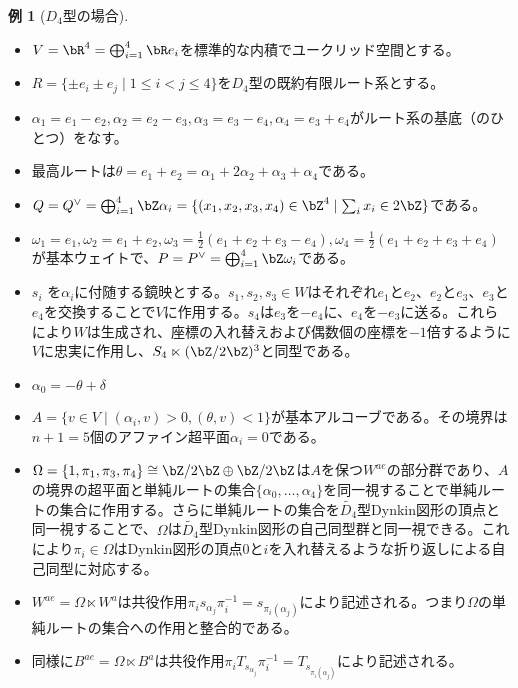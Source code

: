 \documentclass[uplatex, a4paper, dvipdfmx]{jsarticle}
\theoremstyle{definition}
\newtheorem{example}[theorem]{例}
\begin{document}
\begin{example}[$D_4$型の場合]
    \begin{itemize}
        \item  $V = \bR^4 = \bigoplus_{i=1}^4 \bR e_i$を標準的な内積でユークリッド空間とする。
        \item  $R = \{\pm e_i \pm e_j \mid 1 \leq i < j \leq 4\}$を$D_4$型の既約有限ルート系とする。
        \item $\alpha_1 = e_1 - e_2, \alpha_2 = e_2 - e_3, \alpha_3 = e_3 - e_4, \alpha_4 = e_3 + e_4$がルート系の基底（のひとつ）をなす。
        \item 最高ルートは$\theta = e_1 + e_2 = \alpha_1 + 2\alpha_2 + \alpha_3 + \alpha_4$である。
        \item $Q = Q^\vee = \bigoplus_{i=1}^4 \bZ \alpha_i = \{(x_1, x_2, x_3, x_4) \in \bZ^4\mid \sum_i x_i \in 2 \bZ\}$である。
        \item $\omega_1 = e_1, \omega_2 = e_1 + e_2, \omega_3 = \frac{1}{2}(e_1 + e_2 + e_3 - e_4), \omega_4 = \frac{1}{2}(e_1 + e_2 + e_3 + e_4)$が基本ウェイトで、$P = P^\vee = \bigoplus_{i=1}^4 \bZ \omega_i$である。
        \item $s_i$ を$\alpha_i$に付随する鏡映とする。$s_1, s_2, s_3 \in W$はそれぞれ$e_1$と$e_2$、$e_2$と$e_3$、$e_3$と$e_4$を交換することで$V$に作用する。$s_4$は$e_3$を$-e_4$に、$e_4$を$-e_3$に送る。これらにより$W$は生成され、座標の入れ替えおよび偶数個の座標を$-1$倍するように$V$に忠実に作用し、$S_4 \ltimes (\bZ/2\bZ)^3$と同型である。
        \item $\alpha_0 = -\theta + \delta$
        \item $A = \{v \in V \mid (\alpha_i, v)>0, (\theta, v)<1\}$が基本アルコーブである。その境界は$n+1 = 5$個のアファイン超平面$\alpha_i = 0$である。
        \item $\Omega = \{1, \pi_1, \pi_3, \pi_4\} \cong \bZ/2\bZ \oplus \bZ/2\bZ$は$A$を保つ$W^{ae}$の部分群であり、$A$の境界の超平面と単純ルートの集合$\{\alpha_0, \dots, \alpha_4\}$を同一視することで単純ルートの集合に作用する。さらに単純ルートの集合を$\widetilde{D_4}$型Dynkin図形の頂点と同一視することで、$\Omega$は$\widetilde{D_4}$型Dynkin図形の自己同型群と同一視できる。これにより$\pi_i \in \Omega$はDynkin図形の頂点$0$と$i$を入れ替えるような折り返しによる自己同型に対応する。
        \item $W^{ae} = \Omega \ltimes W^a$は共役作用$\pi_i s_{\alpha_j} \pi_i^{-1} = s_{\pi_i(\alpha_j)}$により記述される。つまり$\Omega$の単純ルートの集合への作用と整合的である。
        \item 同様に$B^{ae} = \Omega \ltimes B^a$は共役作用$\pi_i T_{s_{\alpha_j}} \pi_i^{-1} = T_{s_{\pi_i(\alpha_j)}}$により記述される。
    \end{itemize}
\end{example}
\end{document}
